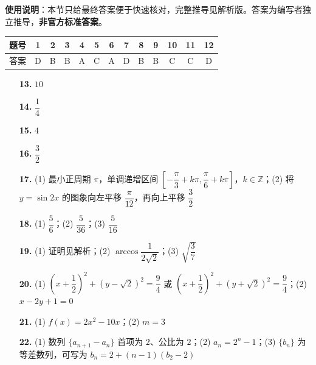 
\begin{gknotice}
\textbf{使用说明}：本节只给最终答案便于快速核对，完整推导见解析版。答案为编写者独立推导，\textbf{非官方标准答案}。
\end{gknotice}

\begin{center}\begin{tabular}{ccccccccccccc}
\toprule
题号 & 1 & 2 & 3 & 4 & 5 & 6 & 7 & 8 & 9 & 10 & 11 & 12 \\
\midrule
答案 & D & B & B & A & C & A & D & B & B & C & C & D \\
\bottomrule
\end{tabular}\end{center}

\begin{itemize}[leftmargin=2.6em]
  \item[\textbf{13.}] $10$
  \item[\textbf{14.}] $\dfrac14$
  \item[\textbf{15.}] $4$
  \item[\textbf{16.}] $\dfrac32$
\end{itemize}

\begin{itemize}[leftmargin=2.6em]
  \item[\textbf{17.}] (1) 最小正周期 $\pi$，单调递增区间 $\left[-\dfrac\pi3+k\pi,\dfrac\pi6+k\pi\right]$，$k\in\mathbb Z$；(2) 将 $y=\sin2x$ 的图象向左平移 $\dfrac\pi{12}$，再向上平移 $\dfrac32$
  \item[\textbf{18.}] (1) $\dfrac56$；(2) $\dfrac5{36}$；(3) $\dfrac5{16}$
  \item[\textbf{19.}] (1) 证明见解析；(2) $\arccos\dfrac1{2\sqrt2}$；(3) $\sqrt{\dfrac37}$
  \item[\textbf{20.}] (1) $\left(x+\dfrac12\right)^2+(y-\sqrt2)^2=\dfrac94$ 或 $\left(x+\dfrac12\right)^2+(y+\sqrt2)^2=\dfrac94$；(2) $x-2y+1=0$
  \item[\textbf{21.}] (1) $f(x)=2x^2-10x$；(2) $m=3$
  \item[\textbf{22.}] (1) 数列 $\{a_{n+1}-a_n\}$ 首项为 $2$、公比为 $2$；(2) $a_n=2^n-1$；(3) $\{b_n\}$ 为等差数列，可写为 $b_n=2+(n-1)(b_2-2)$
\end{itemize}

